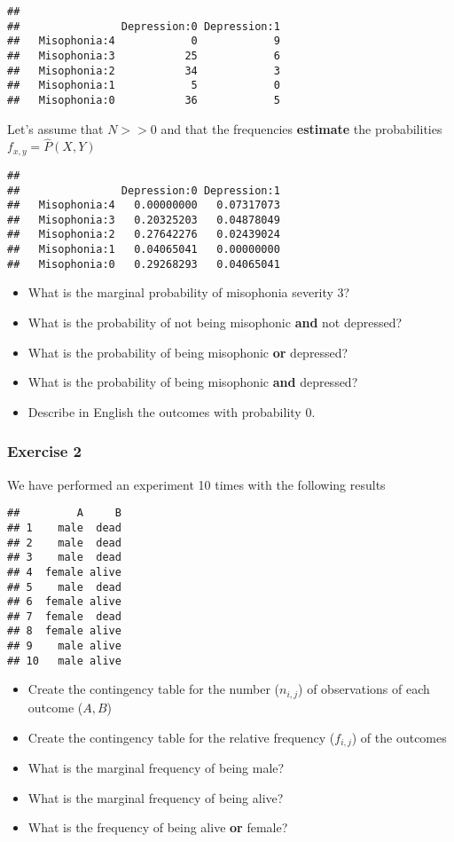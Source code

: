 \documentclass[
]{book}
\providecommand{\tightlist}{%
  \setlength{\itemsep}{0pt}\setlength{\parskip}{0pt}}
\begin{document}
\begin{verbatim}
##               
##                Depression:0 Depression:1
##   Misophonia:4            0            9
##   Misophonia:3           25            6
##   Misophonia:2           34            3
##   Misophonia:1            5            0
##   Misophonia:0           36            5
\end{verbatim}

Let's assume that \(N>>0\) and that the frequencies \textbf{estimate} the probabilities \(f_{x,y}=\hat{P}(X, Y)\)

\begin{verbatim}
##               
##                Depression:0 Depression:1
##   Misophonia:4   0.00000000   0.07317073
##   Misophonia:3   0.20325203   0.04878049
##   Misophonia:2   0.27642276   0.02439024
##   Misophonia:1   0.04065041   0.00000000
##   Misophonia:0   0.29268293   0.04065041
\end{verbatim}

\begin{itemize}
\tightlist
\item
  What is the marginal probability of misophonia severity 3?
\item
  What is the probability of not being misophonic \textbf{and} not depressed?
\item
  What is the probability of being misophonic \textbf{or} depressed?
\item
  What is the probability of being misophonic \textbf{and} depressed?
\item
  Describe in English the outcomes with probability 0.
\end{itemize}

\hypertarget{exercise-2-1}{%
\subsubsection{Exercise 2}\label{exercise-2-1}}

We have performed an experiment 10 times with the following results

\begin{verbatim}
##         A     B
## 1    male  dead
## 2    male  dead
## 3    male  dead
## 4  female alive
## 5    male  dead
## 6  female alive
## 7  female  dead
## 8  female alive
## 9    male alive
## 10   male alive
\end{verbatim}

\begin{itemize}
\tightlist
\item
  Create the contingency table for the number (\(n_{i,j}\)) of observations of each outcome (\(A,B\))
\item
  Create the contingency table for the relative frequency (\(f_{i,j}\)) of the outcomes
\item
  What is the marginal frequency of being male?
\item
  What is the marginal frequency of being alive?
\item
  What is the frequency of being alive \textbf{or} female?
\end{itemize}
\end{document}
